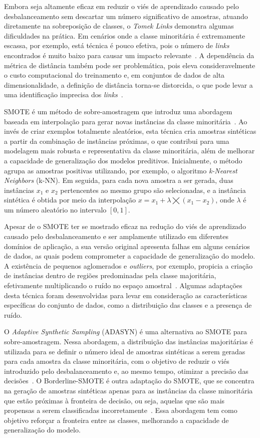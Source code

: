 Embora seja altamente eficaz em reduzir o viés de aprendizado causado pelo desbalanceamento sem descartar um número significativo de amostras, atuando diretamente na sobreposição de classes, o \textit{Tomek Links} demonstra algumas dificuldades na prática. Em cenários onde a classe minoritária é extremamente escassa, por exemplo, está técnica é pouco efetiva, pois o número de \textit{links} encontrados é muito baixo para causar um impacto relevante~\cite{Pereira2020}. A dependência da métrica de distância também pode ser problemática, pois eleva consideravelmente o custo computacional do treinamento e, em conjuntos de dados de alta dimensionalidade, a definição de distância torna-se distorcida, o que pode levar a uma identificação imprecisa dos \textit{links}~\cite{Carvalho2025}.

SMOTE é um método de sobre-amostragem que introduz uma abordagem baseada em interpolação para gerar novas instâncias da classe minoritária~\cite{Chawla2002}. Ao invés de criar exemplos totalmente aleatórios, esta técnica cria amostras sintéticas a partir da combinação de instâncias próximas, o que contribui para uma modelagem mais robusta e representativa da classe minoritária, além de melhorar a capacidade de generalização dos modelos preditivos. Inicialmente, o método agrupa as amostras positivas utilizando, por exemplo, o algoritmo \textit{k-Nearest Neighbors} (k-NN). Em seguida, para cada nova amostra a ser gerada, duas instâncias \(x_{1}\) e \(x_{2}\) pertencentes ao mesmo grupo são selecionadas, e a instância sintética é obtida por meio da interpolação \(x = x_{1} + \lambda \bigtimes (x_{1} - x_{2})\), onde \(\lambda\) é um número aleatório no intervalo \([0, 1]\).

Apesar de o SMOTE ter se mostrado eficaz na redução do viés de aprendizado causado pelo desbalanceamento e ser amplamente utilizado em diferentes domínios de aplicação, a sua versão original apresenta falhas em alguns cenários de dados, as quais podem comprometer a capacidade de generalização do modelo. A existência de pequenos aglomerados e \textit{outliers}, por exemplo, propicia a criação de instâncias dentro de regiões predominadas pela classe majoritária, efetivamente multiplicando o ruído no espaço amostral~\cite{Fernndez2018}. Algumas adaptações desta técnica foram desenvolvidas para levar em consideração as características específicas do conjunto de dados, como a distribuição das classes e a presença de ruído.

O \textit{Adaptive Synthetic Sampling} (ADASYN) é uma alternativa ao SMOTE para sobre-amostragem. Nessa abordagem, a distribuição das instâncias majoritárias é utilizada para se definir o número ideal de amostras sintéticas a serem geradas para cada amostra da classe minoritária, com o objetivo de reduzir o viés introduzido pelo desbalanceamento e, ao mesmo tempo, otimizar a precisão das decisões~\cite{He2008}. O Borderline-SMOTE é outra adaptação do SMOTE, que se concentra na geração de amostras sintéticas apenas para as instâncias da classe minoritária que estão próximas à fronteira de decisão, ou seja, aquelas que são mais propensas a serem classificadas incorretamente~\cite{Han2005}. Essa abordagem tem como objetivo reforçar a fronteira entre as classes, melhorando a capacidade de generalização do modelo.

